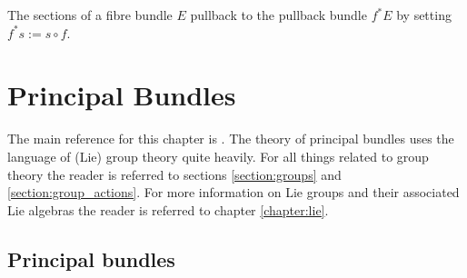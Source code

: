    \begin{property}
        The sections of a fibre bundle $E$ pullback to the pullback bundle $f^*E$ by setting $f^*s := s\circ f$.
    \end{property}



\chapter{Principal Bundles}\label{chapter:principal_bundles}

    The main reference for this chapter is \cite{principal_bundles}. The theory of principal bundles uses the language of (Lie) group theory quite heavily. For all things related to group theory the reader is referred to sections \ref{section:groups} and \ref{section:group_actions}. For more information on Lie groups and their associated Lie algebras the reader is referred to chapter \ref{chapter:lie}.

\section{Principal bundles}

